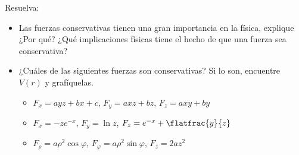 \begin{mdframed}[style=warning]
	\begin{ejercicio}
		Resuelva:
		\begin{itemize}
			\item Las fuerzas conservativas tienen una gran importancia en la física, explique ¿Por qué? ¿Qué implicaciones físicas tiene el hecho de que una fuerza sea conservativa?
			\item ¿Cuáles de las siguientes fuerzas son conservativas? Si lo son, encuentre $V(r)$ y grafíquelas.
			\begin{itemize}
				\item $F_x = ayz + bx + c$, $F_y = axz + bz$, $F_z = axy + by$
				\item $F_x = -ze^{-x}$, $F_y = \ln{z}$, $F_z = e^{-x} + \flatfrac{y}{z}$
				\item $F_\rho = a\rho ^2 \cos{\varphi}$, $F_\varphi = a\rho ^2 \sin{\varphi}$, $F_z = 2az^2$
			\end{itemize}
		\end{itemize}
	\end{ejercicio}
\end{mdframed}

